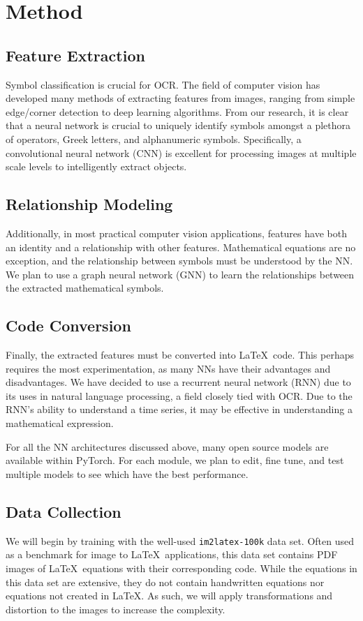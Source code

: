 \section{Method}
\label{sec:method}

\subsection{Feature Extraction}
Symbol classification is crucial for OCR. The field of computer vision has developed many methods of extracting features from images, ranging from simple edge/corner detection to deep learning algorithms. From our research, it is clear that a neural network is crucial to uniquely identify symbols amongst a plethora of operators, Greek letters, and alphanumeric symbols. Specifically, a convolutional neural network (CNN) is excellent for processing images at multiple scale levels to intelligently extract objects.

\subsection{Relationship Modeling}
Additionally, in most practical computer vision applications, features have both an identity and a relationship with other features. Mathematical equations are no exception, and the relationship between symbols must be understood by the NN. We plan to use a graph neural network (GNN) to learn the relationships between the extracted mathematical symbols. 

\subsection{Code Conversion}
Finally, the extracted features must be converted into \LaTeX\ code. This perhaps requires the most experimentation, as many NNs have their advantages and disadvantages. We have decided to use a recurrent neural network (RNN) due to its uses in natural language processing, a field closely tied with OCR. Due to the RNN's ability to understand a time series, it may be effective in understanding a mathematical expression.

For all the NN architectures discussed above, many open source models are available within PyTorch. For each module, we plan to edit, fine tune, and test multiple models to see which have the best performance.

\subsection{Data Collection}
We will begin by training with the well-used {\tt im2latex-100k} data set. Often used as a benchmark for image to \LaTeX\ applications, this data set contains PDF images of \LaTeX\ equations with their corresponding code. While the equations in this data set are extensive, they do not contain handwritten equations nor equations not created in \LaTeX. As such, we will apply transformations and distortion to the images to increase the complexity.

